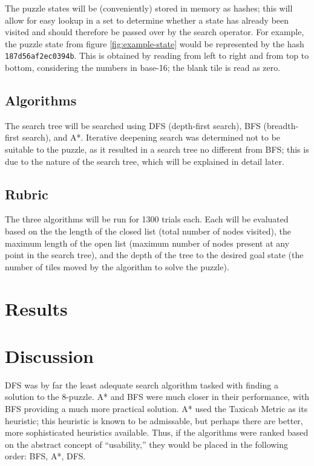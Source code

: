 \documentclass{article}
\begin{document}
    The puzzle states will be (conveniently) stored in memory as hashes; this
    will allow for easy lookup in a set to determine whether a state has already
    been visited and should therefore be passed over by the search operator.
    For example, the puzzle state from figure \ref{fig:example-state} would
    be represented by the hash \texttt{187d56af2ec0394b}. This is obtained
    by reading from left to right and from top to bottom, considering the
    numbers in base-16; the blank tile is read as zero.

  \subsection*{Algorithms}
    The search tree will be searched using DFS (depth-first search), BFS
    (breadth-first search), and A*. Iterative deepening search was determined
    not to be suitable to the puzzle, as it resulted in a search tree no
    different from BFS; this is due to the nature of the search tree, which will
    be explained in detail later.

  \subsection*{Rubric}
    The three algorithms will be run for 1300 trials each. Each will be
    evaluated based on the the length of the closed list (total number of nodes
    visited), the maximum length of the open list (maximum number of nodes
    present at any point in the search tree), and the depth of the tree to the
    desired goal state (the number of tiles moved by the algorithm to solve the
    puzzle).

\pagebreak
\section*{Results}
  

\section*{Discussion}
  DFS was by far the least adequate search algorithm tasked with finding a
  solution to the 8-puzzle. A* and BFS were much closer in their performance,
  with BFS providing a much more practical solution. A* used the Taxicab Metric
  as its heuristic; this heuristic is known to be admissable, but perhaps there
  are better, more sophisticated heuristics available. Thus, if the algorithms
  were ranked based on the abstract concept of ``usability,'' they would be
  placed in the following order: BFS, A*, DFS.
\end{document}
